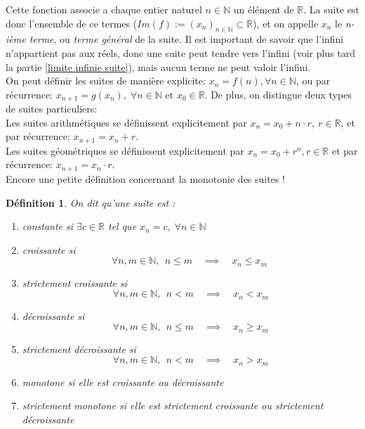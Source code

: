 \documentclass[a4paper, 12pt, french, twoside]{article}
\newtheorem{defi}[theorem]{Définition}
\newcommand{\Nn}{{\mathbb{N}}}
\newcommand{\Rr}{{\mathbb{R}}}
\begin{document}
Cette fonction associe a chaque entier naturel $n\in\Nn$ un élément de $\Rr$. La suite est donc l'ensemble de ce termes ($Im(f):=(x_n)_{n\in\Nn}\subset \Rr$), et on appelle $x_n$ le \textit{n-ième terme}, ou \textit{terme général} de la suite. Il est important de savoir que l'infini n'appartient pas aux réels, donc une suite peut tendre vers l'infini (voir plus tard la partie \ref{limite infinie suite}), mais aucun terme ne peut valoir l'infini.\\

On peut définir les suites de manière explicite: 
$x_n=f(n), \forall n\in\Nn$, ou par récurrence:
$ x_{n+1}=g(x_n), \; \forall n \in \Nn \text{ et } x_0 \in \Rr$.
De plus, on distingue deux types de suites particuliers:
\\Les suites arithmétiques se définissent explicitement par $x_n=x_0+n\cdot r, ~r\in\Rr$, et par récurrence: $x_{n+1}=x_n+r$.
\\Les suites géométriques se définissent explicitement par 
$x_n=x_0+r^n, r\in\Rr$ et par récurrence: $x_{n+1}=x_n\cdot r$.\\


Encore une petite définition concernant la monotonie des suites !

\begin{defi}
    On dit qu'une suite est :
    \begin{enumerate}
        \item constante si $\exists c\in \Rr $ tel que $x_n=c, \; \forall n \in \Nn $
        \item croissante si
        \[\forall n,m \in \Nn, ~~n\leq m\quad\implies\quad x_n\leq x_m \;  \]
        \item strictement croissante si
        \[\forall n,m \in \Nn, ~~n< m\quad\implies\quad x_n< x_m \]
        \item décroissante si
        \[\forall n,m \in \Nn, ~~n\leq m\quad\implies\quad x_n\geq x_m\]
        \item strictement décroissante si
        \[\forall n,m \in \Nn, ~~n< m\quad\implies\quad x_n> x_m \]
        \item monotone si elle est croissante ou décroissante
        \item strictement monotone si elle est strictement croissante ou strictement décroissante
    \end{enumerate}
\end{defi}
\end{document}
